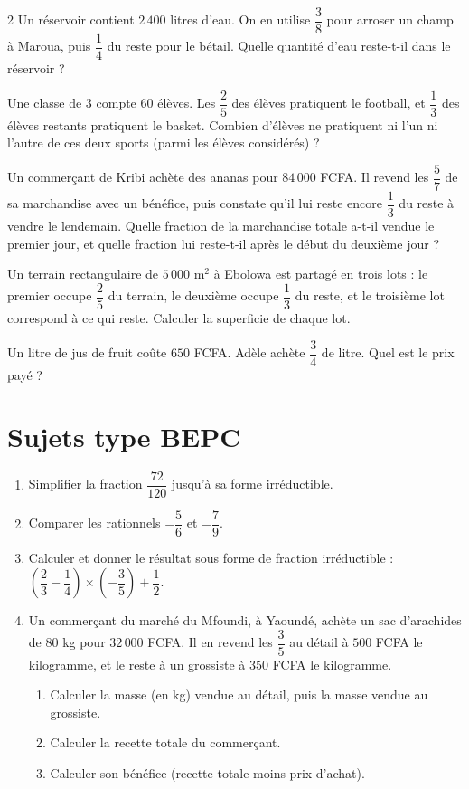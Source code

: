 \begin{multicols}{2}
\exo{} Un réservoir contient $2\,400$ litres d'eau. On en utilise $\dfrac38$ pour
arroser un champ à Maroua, puis $\dfrac14$ du reste pour le bétail. Quelle quantité d'eau
reste-t-il dans le réservoir ?

\exo{} Une classe de 3\ieme{} compte $60$ élèves. Les $\dfrac25$ des élèves pratiquent
le football, et $\dfrac13$ des élèves restants pratiquent le basket. Combien d'élèves ne
pratiquent ni l'un ni l'autre de ces deux sports (parmi les élèves considérés) ?

\exo{} Un commerçant de Kribi achète des ananas pour $84\,000$ FCFA. Il revend les
$\dfrac57$ de sa marchandise avec un bénéfice, puis constate qu'il lui reste encore
$\dfrac13$ du reste à vendre le lendemain. Quelle fraction de la marchandise totale a-t-il
vendue le premier jour, et quelle fraction lui reste-t-il après le début du deuxième jour ?

\exo{} Un terrain rectangulaire de $5\,000\text{ m}^2$ à Ebolowa est partagé en trois
lots : le premier occupe $\dfrac25$ du terrain, le deuxième occupe $\dfrac13$ du reste, et le
troisième lot correspond à ce qui reste. Calculer la superficie de chaque lot.

\exo{} Un litre de jus de fruit coûte $650$ FCFA. Adèle achète $\dfrac34$ de litre.
Quel est le prix payé ?

\end{multicols}

\section{Sujets type BEPC}

\begin{enumerate}[label=\arabic*)]
\item Simplifier la fraction $\dfrac{72}{120}$ jusqu'à sa forme irréductible.
\item Comparer les rationnels $-\dfrac56$ et $-\dfrac79$.
\item Calculer et donner le résultat sous forme de fraction irréductible :
$\left(\dfrac23-\dfrac14\right)\times\left(-\dfrac35\right)+\dfrac12$.
\item Un commerçant du marché du Mfoundi, à Yaoundé, achète un sac d'arachides de $80$ kg
pour $32\,000$ FCFA. Il en revend les $\dfrac35$ au détail à $500$ FCFA le kilogramme, et le
reste à un grossiste à $350$ FCFA le kilogramme.
\begin{enumerate}[label=\alph*)]
\item Calculer la masse (en kg) vendue au détail, puis la masse vendue au grossiste.
\item Calculer la recette totale du commerçant.
\item Calculer son bénéfice (recette totale moins prix d'achat).
\end{enumerate}
\end{enumerate}


